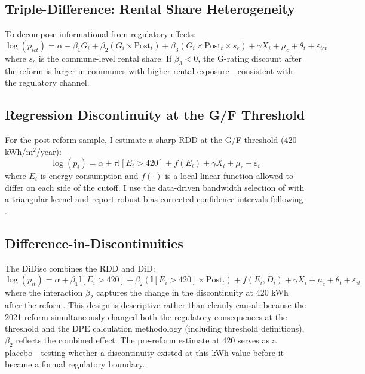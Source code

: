 \documentclass[12pt]{article}
\newcommand{\ind}{\mathbb{I}}
\begin{document}
\subsection{Triple-Difference: Rental Share Heterogeneity}

To decompose informational from regulatory effects:
\begin{equation}
\log(p_{ict}) = \alpha + \beta_1 G_i + \beta_2 (G_i \times \text{Post}_t) + \beta_3 (G_i \times \text{Post}_t \times s_c) + \gamma X_i + \mu_c + \theta_t + \varepsilon_{ict}
\label{eq:triple}
\end{equation}
where $s_c$ is the commune-level rental share. If $\beta_3 < 0$, the G-rating discount after the reform is larger in communes with higher rental exposure---consistent with the regulatory channel.

\subsection{Regression Discontinuity at the G/F Threshold}

For the post-reform sample, I estimate a sharp RDD at the G/F threshold (420 kWh/m$^2$/year):
\begin{equation}
\log(p_i) = \alpha + \tau \ind[E_i > 420] + f(E_i) + \gamma X_i + \mu_c + \varepsilon_i
\label{eq:rdd}
\end{equation}
where $E_i$ is energy consumption and $f(\cdot)$ is a local linear function allowed to differ on each side of the cutoff. I use the data-driven bandwidth selection of \citet{imbens2012optimal} with a triangular kernel and report robust bias-corrected confidence intervals following \citet{calonico2014robust}.

\subsection{Difference-in-Discontinuities}

The DiDisc combines the RDD and DiD:
\begin{equation}
\log(p_{it}) = \alpha + \beta_1 \ind[E_i > 420] + \beta_2 (\ind[E_i > 420] \times \text{Post}_t) + f(E_i, D_i) + \gamma X_i + \mu_c + \theta_t + \varepsilon_{it}
\label{eq:didisc}
\end{equation}
where the interaction $\beta_2$ captures the change in the discontinuity at 420 kWh after the reform. This design is descriptive rather than cleanly causal: because the 2021 reform simultaneously changed both the regulatory consequences at the threshold and the DPE calculation methodology (including threshold definitions), $\beta_2$ reflects the combined effect. The pre-reform estimate at 420 serves as a placebo---testing whether a discontinuity existed at this kWh value before it became a formal regulatory boundary.
\end{document}
